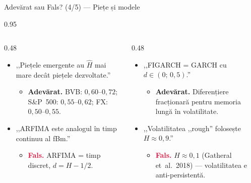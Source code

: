 \documentclass[9pt, aspectratio=169, t]{beamer}
\begin{document}
\begin{frame}[shrink=15]{Adevărat sau Fals? (4/5) --- Piețe și modele}
\begin{cminipage}{0.95\textwidth}
\begin{columns}[T]
\begin{column}{0.48\textwidth}
\begin{itemize}\setlength{\itemsep}{2pt}
    \item ,,Piețele emergente au $\hat H$ mai mare decât piețele dezvoltate.''
    \begin{itemize}\setlength{\itemsep}{0pt}
        \item[] \textcolor{Forest}{\textbf{Adevărat.}} BVB: $0{,}60$--$0{,}72$; S\&P~500: $0{,}55$--$0{,}62$; FX: $0{,}50$--$0{,}55$.
    \end{itemize}
    \item ,,ARFIMA este analogul în timp continuu al fBm.''
    \begin{itemize}\setlength{\itemsep}{0pt}
        \item[] \textcolor{Crimson}{\textbf{Fals.}} ARFIMA = timp discret, $d=H-1/2$.
    \end{itemize}
\end{itemize}
\end{column}
\begin{column}{0.48\textwidth}
\begin{itemize}\setlength{\itemsep}{2pt}
    \item ,,FIGARCH = GARCH cu $d\in(0;\,0{,}5)$.''
    \begin{itemize}\setlength{\itemsep}{0pt}
        \item[] \textcolor{Forest}{\textbf{Adevărat.}} Diferențiere fracționară pentru memoria lungă în volatilitate.
    \end{itemize}
    \item ,,Volatilitatea ,,rough'' folosește $H\approx 0{,}9$.''
    \begin{itemize}\setlength{\itemsep}{0pt}
        \item[] \textcolor{Crimson}{\textbf{Fals.}} $H\approx 0{,}1$ (Gatheral et~al.\ 2018) --- volatilitatea e anti-persistentă.
    \end{itemize}
\end{itemize}
\end{column}
\end{columns}
\end{cminipage}
\end{frame}
\end{document}
